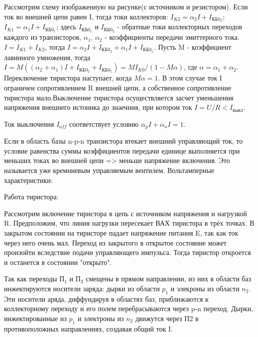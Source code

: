 Рассмотрим схему изображенную на рисунке(с источником и резистором). Если ток во внешней цепи равен I, тогда токи коллекторов:
$I_{K2} = \alpha_2I+I_{КБ0}_2$; $I_{K1} = \alpha_1I+I_{КБ0}_1$;
здесь $I_{КБ0}_1$ и $I_{КБ0}_2$ - обратные токи коллекторных переходов каждого из транзисторов, $\alpha_1$, $\alpha_2$ - коэффициенты передачи эмиттерного тока. $I = I_{K1}+I_{K2}$, тогда  $I = \alpha_2I+I_{КБ0}_2+\alpha_1I+I_{КБ0}_1$.
Пусть M - коэффициент лавинного умножения, тогда $I = M( (\alpha_2+\alpha_1)I+I_{КБ0}_2+I_{КБ0}_1) = MI_{K0}/(1-M\alpha) $, где $\alpha = \alpha_1+\alpha_2$. Переключение тиристора наступает, когда $M\alpha = 1$. В этом случае ток I ограничен сопротивлением R внешней цепи, а собственное сопротивление тиристора мало.Выключение тиристора осуществляется засчет уменьшения напряжения внешнего истоника до знаечния, при котором ток $I=U/R < I_{выкл}$.

Ток выключения $I_{off}$ соответствует условию $\alpha_pI + \alpha_nI = 1$.

Если в область базы n-p-n транзистора втекает внешний управляющий ток, то условие равенства суммы коэффициентов передачи единице выполняется при меньших токах во внешней цепи => меньше напряжение включения. Это называется уже кремниевым управляемым вентилем. Вольтамперные характеристики:

\begin{center}
	\begin{figure}[h!]
		\caption{}	
	\end{figure}
\end{center}

Работа тиристора:
\begin{center}
	\begin{figure}[h!]
		\caption{}	
	\end{figure}
\end{center}

Рассмотрим включение тиристора в цепь с источником напряжения и нагрузкой R. Предположим, что линия нагрузки пересекает ВАХ тиристора в трёх точках. В закрытом состоянии на тиристоре падает напряжение питания E, так как ток через него очень мал. Переход из закрытого в открытое состояние может произойти вследствие подачи управляющего импульса. Тогда тиристор откроется и останется в состоянии "открыто".

Так как переходы П$_1$ и П$_3$ смещены в прямом направлении, из них в области баз инжектируются носители заряда: дырки из области $p_1$ и элекроны из области $n_2$. Эти носители аряда, диффундируя в областях баз, приближаются к коллекторному переходу и его полем перебрасываются через p-n переход. Дырки, инжектированные из $p_1$ и электроны из $n_2$ движутся через П2 в противоположных направлениях, создавая общий ток I.

